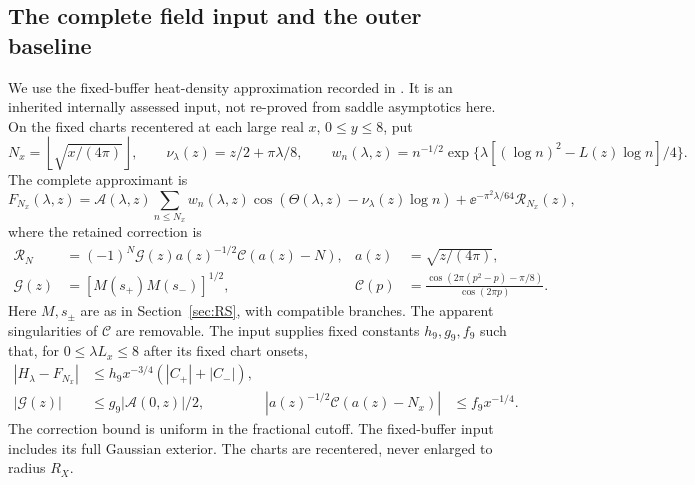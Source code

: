 \subsection{The complete field input and the outer baseline}
We use the fixed-buffer heat-density approximation recorded in
\cite{GNPRSHDA,GNPRSOuter}. It is an inherited internally assessed
input, not re-proved from saddle asymptotics here. On the fixed charts
recentered at each large real \(x\), \(0\le y\le8\), put
\[
 N_x=\left\lfloor\sqrt{x/(4\pi)}\right\rfloor,\qquad
 \nu_\lambda(z)=z/2+\pi\lambda/8,\qquad
 w_n(\lambda,z)=n^{-1/2}
   \exp\{\lambda[(\log n)^2-L(z)\log n]/4\}.
\]
The complete approximant is
\begin{equation}\label{eq:transition-provider}
 F_{N_x}(\lambda,z)=\mathcal A(\lambda,z)
       \sum_{n\le N_x}w_n(\lambda,z)
       \cos(\Theta(\lambda,z)-\nu_\lambda(z)\log n)
       +\ee^{-\pi^2\lambda/64}\mathcal R_{N_x}(z),
\end{equation}
where the retained correction is
\begin{align*}
 \mathcal R_N&=(-1)^N\mathcal G(z)a(z)^{-1/2}\mathcal C(a(z)-N),
 &a(z)&=\sqrt{z/(4\pi)},\\
 \mathcal G(z)&=[M(s_+)M(s_-)]^{1/2},
 &\mathcal C(p)&=\frac{\cos(2\pi(p^2-p)-\pi/8)}{\cos(2\pi p)}.
\end{align*}
Here \(M,s_\pm\) are as in Section~\ref{sec:RS}, with compatible
branches. The apparent singularities of \(\mathcal C\) are removable.
The input supplies fixed constants \(h_9,g_9,f_9\) such that, for
\(0\le\lambda L_x\le8\) after its fixed chart onsets,
\begin{align}\label{eq:transition-provider-bounds}
 |H_\lambda-F_{N_x}|&\le h_9x^{-3/4}(|C_+|+|C_-|),\nonumber\\
 |\mathcal G(z)|&\le g_9|\mathcal A(0,z)|/2,
 &|a(z)^{-1/2}\mathcal C(a(z)-N_x)|&\le f_9x^{-1/4}.
\end{align}
The correction bound is uniform in the fractional cutoff. The
fixed-buffer input includes its full Gaussian exterior. The charts
are recentered, never enlarged to radius \(R_X\).

